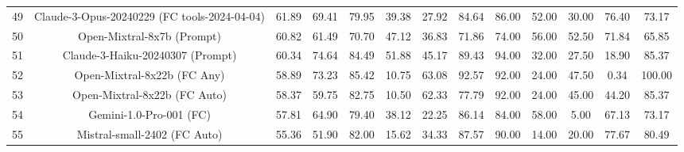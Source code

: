 \documentclass{article}
\begin{document}
\begin{table}[h]
{\begin{tabular}{ccccccccccccc}
49                     & Claude-3-Opus-20240229 (FC tools-2024-04-04)   & 61.89                         & 69.41  & 79.95    & 39.38    & 27.92                                                       & 84.64  & 86.00    & 52.00    & 30.00                                                       & 76.40                         & 73.17                       \\
50                     & Open-Mixtral-8x7b (Prompt)                     & 60.82                         & 61.49  & 70.70    & 47.12    & 36.83                                                       & 71.86  & 74.00    & 56.00    & 52.50                                                       & 71.84                         & 65.85                       \\
51                     & Claude-3-Haiku-20240307 (Prompt)               & 60.34                         & 74.64  & 84.49    & 51.88    & 45.17                                                       & 89.43  & 94.00    & 32.00    & 27.50                                                       & 18.90                         & 85.37                       \\
52                     & Open-Mixtral-8x22b (FC Any)                    & 58.89                         & 73.23  & 85.42    & 10.75    & 63.08                                                       & 92.57  & 92.00    & 24.00    & 47.50                                                       & 0.34                          & 100.00                      \\
53                     & Open-Mixtral-8x22b (FC Auto)                   & 58.37                         & 59.75  & 82.75    & 10.50    & 62.33                                                       & 77.79  & 92.00    & 24.00    & 45.00                                                       & 44.20                         & 85.37                       \\
54                     & Gemini-1.0-Pro-001 (FC)                        & 57.81                         & 64.90  & 79.40    & 38.12    & 22.25                                                       & 86.14  & 84.00    & 58.00    & 5.00                                                        & 67.13                         & 73.17                       \\
55                     & Mistral-small-2402 (FC Auto)                   & 55.36                         & 51.90  & 82.00    & 15.62    & 34.33                                                       & 87.57  & 90.00    & 14.00    & 20.00                                                       & 77.67                         & 80.49                       \\

\end{tabular}}
\end{table}
\end{document}
